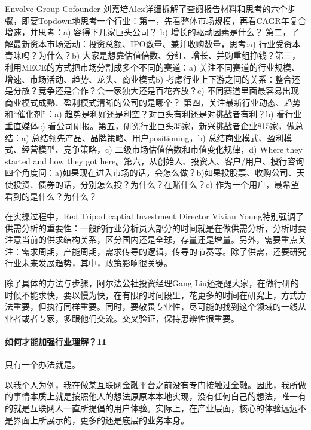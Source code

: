 \documentclass[letterpaper,10pt,english]{sphinxmanual}
\begin{document}
Envolve Group Co\sphinxhyphen{}founder
刘嘉培Alex详细拆解了查阅报告材料和思考的六个步骤，即要Top\sphinxhyphen{}down地思考一个行业：第一，先看整体市场规模，再看CAGR年复合增速，并思考：a)
容得下几家巨头公司？ b) 增长的驱动因素是什么？
第二，了解最新资本市场活动：投资总额、IPO数量、兼并收购数量，思考:a)
行业受资本青睐吗？为什么？b)
大家是想靠估值倍数、分红、增长、并购重组挣钱？第三，利用MECE的方式把市场分割成多个不同的赛道：a)
关注不同赛道的行业规模、增速、市场活动、趋势、龙头、商业模式b)
考虑行业上下游之间的关系：整合还是分散？竞争还是合作？会一家独大还是百花齐放？c)
不同赛道里面最容易出现商业模式成熟、盈利模式清晰的公司的是哪个？
第四，关注最新行业动态、趋势和“催化剂”：a)
趋势是利好还是利空？对巨头有利还是对挑战者有利？b) 看行业垂直媒体c)
看公司研报。第五，研究行业巨头3\sphinxhyphen{}5家，新兴挑战者企业8\sphinxhyphen{}15家，做总结：a)
总结领先产品、品牌策略、用户positioning，b)
总结商业模式、盈利模式、经营模型、竞争策略，c)
二级市场估值倍数和市值变化规律，d) Where they started and how they got
here。第六，从创始人、投资人、客户/用户、投行咨询四个角度问：a)如果现在进入市场的话，会怎么做？b)如果投股票、收购公司、天使投资、债券的话，分别怎么投？为什么？在赌什么？c)
作为一个用户，最希望看到的是什么？为什么？

在实操过程中，Red Tripod captial Investment Director Vivian
Young特别强调了供需分析的重要性：一般的行业分析员大部分的时间就是在做供需分析，分析时要注意当前的供求结构关系，区分国内还是全球，存量还是增量。另外，需要重点关注：需求周期，产能周期，需求传导的逻辑，传导的节奏等。除了供需，还要研究行业未来发展趋势，其中，政策影响很关键。

除了具体的方法与步骤，阿尔法公社投资经理Gang
Liu还提醒大家，在做行研的时候不能求快，要以慢为快，在有限的时间段里，花更多的时间在研究上，方式方法重要，但执行同样重要。同时，要敬畏专业性，尽可能的找到这个领域的一线从业者或者专家，多跟他们交流。交叉验证，保持思辨性很重要。


\paragraph{如何才能加强行业理解？11\sphinxfootnotemark[512]}
\label{\detokenize{chapter_knowledge/industry_analysis:id22}}%
\begin{footnotetext}[512]\sphinxAtStartFootnote
{}
%
\end{footnotetext}\ignorespaces 
只有一个办法就是。

以我个人为例，我在做某互联网金融平台之前没有专门接触过金融。因此，我所做的事情本质上就是按照他人的想法原原本本地实现，没有任何自己的想法，唯一有的就是互联网人一直所提倡的用户体验。实际上，在产业层面，核心的体验远远不是界面上所展示的，更多的还是底层的业务本身。
\end{document}
